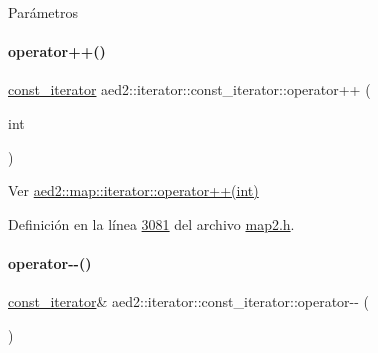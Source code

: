 \begin{DoxyParams}{\-Parámetros}
\begin{DoxyCompactItemize}
\mbox{\label{classaed2_1_1iterator_1_1const__iterator_a27088afe8fffc9d7fdc2f1596b401d46_a27088afe8fffc9d7fdc2f1596b401d46}} 
\paragraph{\texorpdfstring{operator++()}{operator++()}\hspace{0.1cm}{\footnotesize\ttfamily [2/2]}}
{\footnotesize\ttfamily \hyperlink{classaed2_1_1iterator_1_1const__iterator}{const\+\_\+iterator} aed2\+::iterator\+::const\+\_\+iterator\+::operator++ (\begin{DoxyParamCaption}\item[{int}]{ }\end{DoxyParamCaption})\hspace{0.3cm}{\ttfamily [inline]}}



Ver \hyperlink{classaed2_1_1map_1_1iterator_af4fe5565eb478cfccd254b2ef230b974_af4fe5565eb478cfccd254b2ef230b974}{aed2\+::map\+::iterator\+::operator++(int)} 



Definición en la línea \hyperlink{map2_8h_source_l03081}{3081} del archivo \hyperlink{map2_8h_source}{map2.\+h}.

\mbox{\label{classaed2_1_1iterator_1_1const__iterator_a1aac8371db66fcc4035863537b554b99_a1aac8371db66fcc4035863537b554b99}} 
\paragraph{\texorpdfstring{operator-\/-\/()}{operator--()}\hspace{0.1cm}{\footnotesize\ttfamily [1/2]}}
{\footnotesize\ttfamily \hyperlink{classaed2_1_1iterator_1_1const__iterator}{const\+\_\+iterator}\& aed2\+::iterator\+::const\+\_\+iterator\+::operator-\/-\/ (\begin{DoxyParamCaption}{ }\end{DoxyParamCaption})\hspace{0.3cm}{\ttfamily [inline]}}




\end{DoxyCompactItemize}
\end{DoxyParams}
